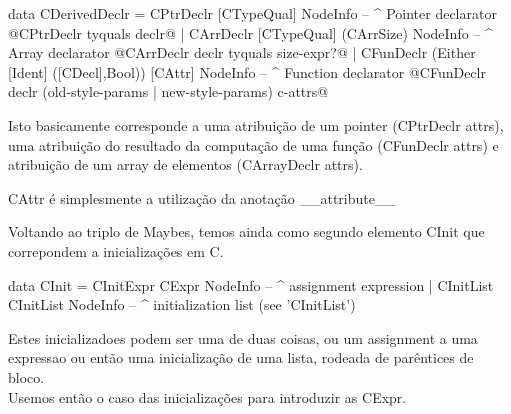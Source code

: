 \begin{haskell}
data CDerivedDeclr = CPtrDeclr [CTypeQual] NodeInfo
                   -- ^ Pointer declarator @CPtrDeclr tyquals declr@
                   | CArrDeclr [CTypeQual] (CArrSize) NodeInfo
                   -- ^ Array declarator @CArrDeclr declr tyquals size-expr?@
                   | CFunDeclr (Either [Ident] ([CDecl],Bool)) [CAttr] NodeInfo
                   -- ^ Function declarator @CFunDeclr declr (old-style-params | new-style-params) c-attrs@
\end{haskell}

Isto basicamente corresponde a uma atribuição de um pointer (CPtrDeclr attrs),
uma atribuição do resultado da computação de uma função (CFunDeclr attrs) e
atribuição de um array de elementos (CArrayDeclr attrs).

\textrm{CAttr} é simplesmente a utilização da anotação \_\_attribute\_\_

Voltando ao triplo de Maybes, temos ainda como segundo elemento \textrm{CInit} que correpondem a inicializações em C.

\begin{haskell}
data CInit = CInitExpr CExpr
             NodeInfo            -- ^ assignment expression
           | CInitList CInitList
             NodeInfo            -- ^ initialization list (see 'CInitList')
\end{haskell}
Estes inicializadoes podem ser uma de duas coisas, ou um assignment a uma expressao ou então
uma inicialização de uma lista, rodeada de parêntices de bloco.\\
Usemos então o caso das inicializações para introduzir as \textrm{CExpr}.

